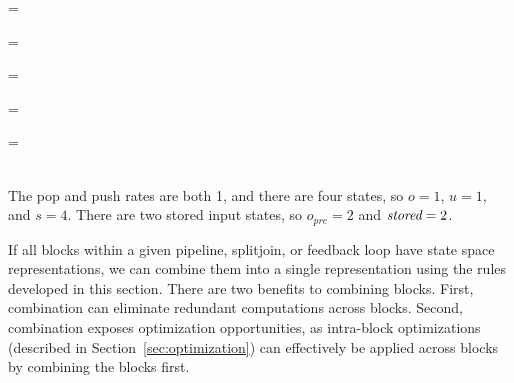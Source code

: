 \begin{minipage}{1.6in}
\starteqnstar
{} = 
\doneeqnstar
\end{minipage}
\begin{minipage}{1.4in}
\starteqnstar
{} = \left [ \begin{array} {c} 1/6 \end{array} \right ]
\doneeqnstar
\end{minipage}

\hspace{1in}
\begin{minipage}{1in}
\starteqnstar
{} = \left [ \begin{array} {c}
0 \\ 0 \\ 0 \\ 1 \end{array} \right ]
\doneeqnstar
\end{minipage}

\begin{minipage}{1.6in}
\starteqnstar
{} = 
\doneeqnstar
\end{minipage}
\begin{minipage}{1in}
\starteqnstar
{} = \left [ \begin{array} {cc} 1 & 0 \\ 0 & 1
\\ 0 & 0 \\ 0 & 0 \end{array} \right ]
\doneeqnstar
\end{minipage} ~\\

The pop and push rates are both 1, and there are four states, so $o =
1$, $u = 1$, and $s = 4$.  There are two stored input states, so
$o_{pre} = 2$ and $\mbox{\it stored} = 2$.


If all blocks within a given pipeline, splitjoin, or feedback loop
have state space representations, we can combine them into a single
representation using the rules developed in this section.  There are
two benefits to combining blocks.  First, combination can eliminate
redundant computations across blocks.  Second, combination exposes
optimization opportunities, as intra-block optimizations (described in
Section~\ref{sec:optimization}) can effectively be applied across
blocks by combining the blocks first.

